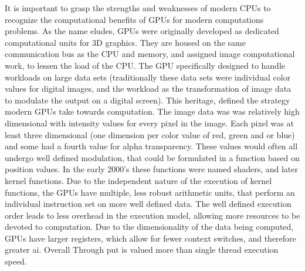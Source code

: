 It is important to grasp the strengths and weaknesses of modern \Glspl{CPU} to
recognize the computational benefits of \Glspl{GPU}
for modern computations problems.  As the name eludes, \Glspl{GPU} were originally developed
as dedicated computational units for 3D graphics\cite{Sanders}.  They are housed on the same
communication bus as the \Gls{CPU} and memory, and assigned image computational work,
to lessen the load of the \Gls{CPU}.
The GPU specifically designed to handle workloads on large data sets (traditionally these
data sets were individual color values for digital images, and the workload as
the transformation of image data to modulate the output on a digital screen).
This heritage,
defined the strategy modern GPUs take towards computation.
The image data was was relatively high dimensional with intensity values for every pixel in the image.
Each pixel was at least three dimensional (one dimension per color value of red, green and or blue) and
some had a fourth value for alpha transparency. These values would often all undergo
well defined modulation, that could be formulated in a function based on position values.
In the early 2000's these functions were named shaders, and later kernel functions.\cite{5751939}
Due to the independent nature of the execution of kernel functions, the GPUs have multiple, less robust
arithmetic units, that perform an individual instruction set on more well defined data.
The well defined execution order leads to less overhead in the execution
model, allowing more resources to be devoted to computation.
Due to the dimensionality of the data being computed, \Glspl{GPU} have larger registers\cite{5751939},
which allow for fewer context switches, and therefore greater \gls{ai}.  Overall
Through put is valued more than single thread execution speed.  %

